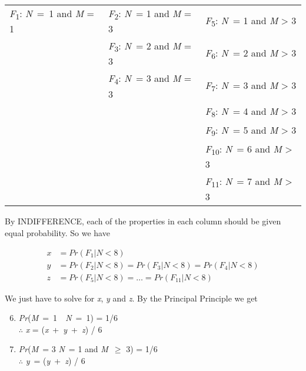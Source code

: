 \begin{tabular}{l l l}
\textit{F}\textsubscript{1}: \textit{N}~=~1 and \textit{M} = 1 &
\textit{F}\textsubscript{2}: \textit{N}~= 1 and \textit{M} = 3 &
\textit{F}\textsubscript{5}: \textit{N}~= 1 and \textit{M} {\textgreater} 3\\
~
 &
\textit{F}\textsubscript{3}: \textit{N}~= 2 and \textit{M} = 3 &
\textit{F}\textsubscript{6}: \textit{N}~= 2 and \textit{M} {\textgreater} 3\\
~
 &
\textit{F}\textsubscript{4}: \textit{N}~= 3 and \textit{M} = 3 &
\textit{F}\textsubscript{7}: \textit{N}~= 3 and \textit{M} {\textgreater} 3\\
~
 &
~
 &
\textit{F}\textsubscript{8}: \textit{N}~= 4 and \textit{M} {\textgreater} 3\\
~
 &
~
 &
\textit{F}\textsubscript{9}: \textit{N}~= 5 and \textit{M} {\textgreater} 3\\
~
 &
~
 &
\textit{F}\textsubscript{10}: \textit{N}~= 6 and \textit{M} {\textgreater} 3\\
~
 &
~
 &
\textit{F}\textsubscript{11}: \textit{N}~= 7 and \textit{M} {\textgreater} 3\\
\end{tabular}

\noindent By INDIFFERENCE, each of the properties in each column should be given equal probability. So we have

\begin{align}
x &= Pr(F_1 | N < 8)  \\
y &= Pr(F_2 | N < 8) = Pr(F_3 | N < 8) = Pr(F_4 | N < 8)  \\
z &= Pr(F_5 | N < 8) = \dots = Pr(F_11 | N < 8)  
\end{align}

\noindent We just have to solve for \textit{x}, \textit{y} and \textit{z}. By the Principal Principle we get

\begin{enumerate}
\setcounter{enumi}{5}
\renewcommand{\labelenumi}{(\arabic{enumi})}
\item \textit{Pr}(\textit{M}~=~1~{\textbar}~\textit{N}~=~1) = 1/6 \\
${\therefore}$ \textit{x} = (\textit{x}~+~\textit{y}~+~\textit{z}) / 6
\item \textit{Pr}(\textit{M}~= 3 {\textbar} \textit{N}~= 1 and \textit{M}~${\geq}$ 3) = 1/6 \\
${\therefore}$ \textit{y}~= (\textit{y}~+~\textit{z}) / 6
\end{enumerate}

